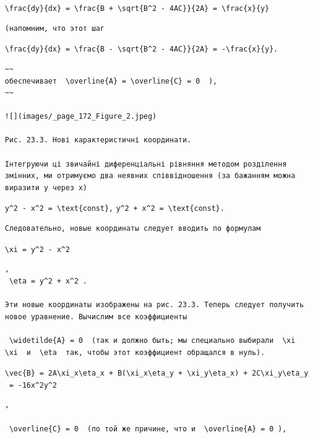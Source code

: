 \documentclass[
  ukrainian,
]{article}
\begin{document}
\texttt{\textbackslash{}frac\{dy\}\{dx\}\ =\ \textbackslash{}frac\{B\ +\ \textbackslash{}sqrt\{B\^{}2\ -\ 4AC\}\}\{2A\}\ =\ \textbackslash{}frac\{x\}\{y\}}

\begin{verbatim}
(напомним, что этот шаг
\end{verbatim}

\texttt{\textbackslash{}frac\{dy\}\{dx\}\ =\ \textbackslash{}frac\{B\ -\ \textbackslash{}sqrt\{B\^{}2\ -\ 4AC\}\}\{2A\}\ =\ -\textbackslash{}frac\{x\}\{y\}.}

\begin{verbatim}
~~
обеспечивает  \overline{A} = \overline{C} = 0  ),
~~

![](images/_page_172_Figure_2.jpeg)

Рис. 23.3. Нові карактеристичні координати.

Інтегруючи ці звичайні диференціальні рівняння методом розділення змінних, ми отримуємо два неявних співвідношення (за бажанням можна виразити y через x)
\end{verbatim}

\texttt{y\^{}2\ -\ x\^{}2\ =\ \textbackslash{}text\{const\},}
\texttt{y\^{}2\ +\ x\^{}2\ =\ \textbackslash{}text\{const\}.}

\begin{verbatim}
Следовательно, новые координаты следует вводить по формулам
\end{verbatim}

\texttt{\textbackslash{}xi\ =\ y\^{}2\ -\ x\^{}2}

\begin{verbatim}
,  
 \eta = y^2 + x^2 .

Эти новые координаты изображены на рис. 23.3. Теперь следует получить новое уравнение. Вычислим все коэффициенты

 \widetilde{A} = 0  (так и должно быть; мы специально выбирали  \xi \xi  и  \eta  так, чтобы этот коэффициент обращался в нуль).
\end{verbatim}

\texttt{\textbackslash{}vec\{B\}\ =\ 2A\textbackslash{}xi\_x\textbackslash{}eta\_x\ +\ B(\textbackslash{}xi\_x\textbackslash{}eta\_y\ +\ \textbackslash{}xi\_y\textbackslash{}eta\_x)\ +\ 2C\textbackslash{}xi\_y\textbackslash{}eta\_y\ =\ -16x\^{}2y\^{}2}

\begin{verbatim}
,

 \overline{C} = 0  (по той же причине, что и  \overline{A} = 0 ),
\end{verbatim}
\end{document}
